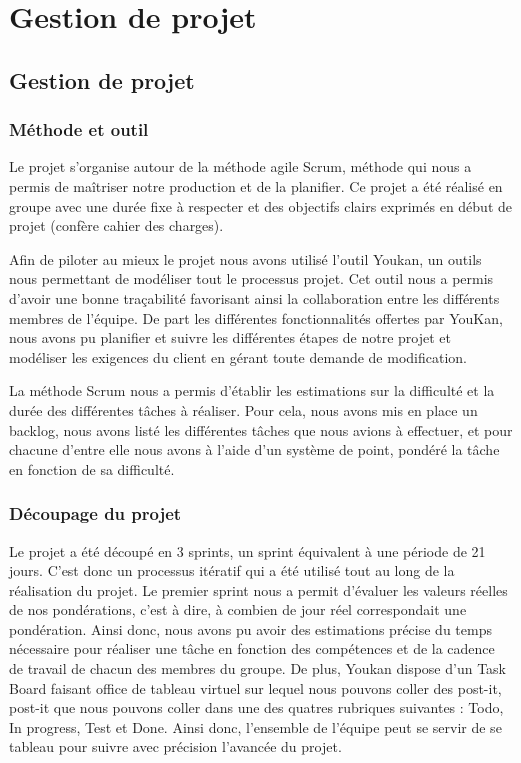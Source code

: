 \chapter{Gestion de projet}
\minitoc

\section{Gestion de projet}

\subsection{Méthode et outil}

Le projet s'organise autour de la méthode agile Scrum, méthode qui nous a permis de maîtriser notre production et de la planifier. Ce projet a été réalisé en groupe avec une durée fixe à respecter et des objectifs clairs exprimés en début de projet (confère cahier des charges).

Afin de piloter au mieux le projet nous avons utilisé l'outil Youkan, un outils nous permettant de modéliser tout le processus projet. Cet outil nous a permis d'avoir une bonne traçabilité favorisant ainsi la collaboration entre les différents membres de l'équipe.
De part les différentes fonctionnalités offertes par YouKan, nous avons pu planifier et suivre les différentes étapes de notre projet et modéliser les exigences du client en gérant toute demande de modification.

La méthode Scrum nous a permis d'établir les estimations sur la difficulté et la durée des différentes tâches à réaliser. Pour cela, nous avons mis en place un backlog, nous avons listé les différentes tâches que nous avions à effectuer, et pour chacune d'entre elle nous avons à l'aide d'un système de point, pondéré la tâche en fonction de sa difficulté. 

\subsection{Découpage du projet}

Le projet a été découpé en 3 sprints, un sprint équivalent à une période de 21 jours. C'est donc un processus itératif qui a été utilisé tout au long de la réalisation du projet. Le premier sprint nous a permit d'évaluer les valeurs réelles de nos pondérations, c'est à dire, à combien de jour réel correspondait une pondération. Ainsi donc, nous avons pu avoir des estimations précise du temps nécessaire pour réaliser une tâche en fonction des compétences et de la cadence de travail de chacun des membres du groupe. 
De plus, Youkan dispose d'un Task Board faisant office de tableau virtuel sur lequel nous pouvons coller des post-it, post-it que nous pouvons coller dans une des quatres rubriques suivantes : Todo, In progress, Test et Done. Ainsi donc, l'ensemble de l'équipe peut se servir de se tableau pour suivre avec précision l'avancée du projet.

